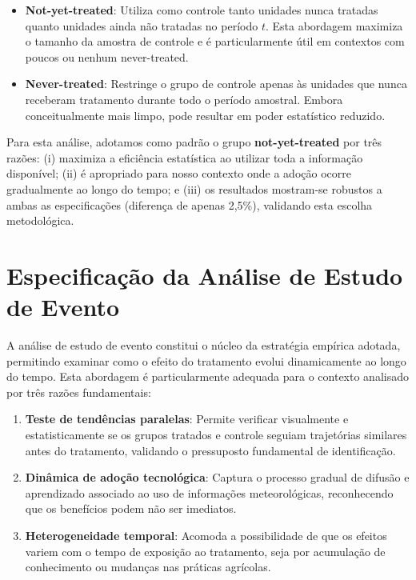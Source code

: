 \documentclass[
	12pt,				%
	oneside,			%
	a4paper,			%
	english,			%
	french,				%
	spanish,			%
	brazil				%
	]{abntex2}
\begin{document}
\begin{itemize}
\item \textbf{Not-yet-treated}: Utiliza como controle tanto unidades nunca tratadas quanto unidades ainda não tratadas no período $t$. Esta abordagem maximiza o tamanho da amostra de controle e é particularmente útil em contextos com poucos ou nenhum never-treated.

\item \textbf{Never-treated}: Restringe o grupo de controle apenas às unidades que nunca receberam tratamento durante todo o período amostral. Embora conceitualmente mais limpo, pode resultar em poder estatístico reduzido.
\end{itemize}

Para esta análise, adotamos como padrão o grupo \textbf{not-yet-treated} por três razões: (i) maximiza a eficiência estatística ao utilizar toda a informação disponível; (ii) é apropriado para nosso contexto onde a adoção ocorre gradualmente ao longo do tempo; e (iii) os resultados mostram-se robustos a ambas as especificações (diferença de apenas 2,5\%), validando esta escolha metodológica.

\section{Especificação da Análise de Estudo de Evento}

A análise de estudo de evento constitui o núcleo da estratégia empírica adotada, permitindo examinar como o efeito do tratamento evolui dinamicamente ao longo do tempo. Esta abordagem é particularmente adequada para o contexto analisado por três razões fundamentais:

\begin{enumerate}
\item \textbf{Teste de tendências paralelas}: Permite verificar visualmente e estatisticamente se os grupos tratados e controle seguiam trajetórias similares antes do tratamento, validando o pressuposto fundamental de identificação.

\item \textbf{Dinâmica de adoção tecnológica}: Captura o processo gradual de difusão e aprendizado associado ao uso de informações meteorológicas, reconhecendo que os benefícios podem não ser imediatos.

\item \textbf{Heterogeneidade temporal}: Acomoda a possibilidade de que os efeitos variem com o tempo de exposição ao tratamento, seja por acumulação de conhecimento ou mudanças nas práticas agrícolas.
\end{enumerate}
\end{document}

